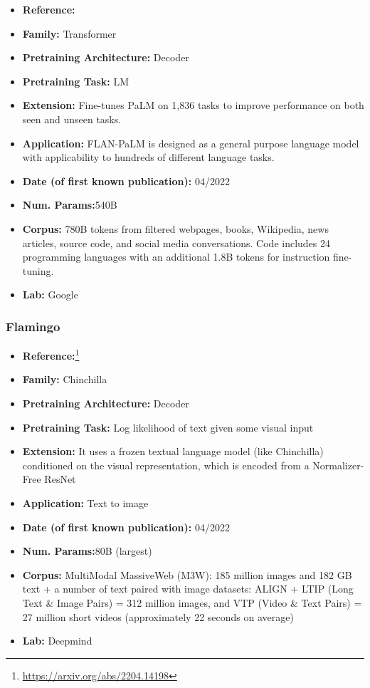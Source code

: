 \documentclass{article}
\begin{document}
            \begin{itemize}
                \item \textbf{Reference:}\cite{chung2022flan}
                \item \textbf{Family:} Transformer 
                \item \textbf{Pretraining Architecture:} Decoder
                \item \textbf{Pretraining Task:} LM
                \item \textbf{Extension:} Fine-tunes PaLM on 1,836 tasks to improve performance on both seen and unseen tasks.
                \item \textbf{Application:} FLAN-PaLM is designed as a general purpose language model with applicability to hundreds of different language tasks.
                \item \textbf{Date (of first known publication):} 04/2022
                \item \textbf{Num. Params:}540B
                \item \textbf{Corpus:} 780B tokens from filtered webpages, books, Wikipedia, news articles, source code, and social media conversations. Code includes 24 programming languages with an additional 1.8B tokens for instruction fine-tuning.
                \item \textbf{Lab:} Google
            \end{itemize}

\subsubsection{Flamingo}

            \begin{itemize}
                \item \textbf{Reference:}\footnote{\url{https://arxiv.org/abs/2204.14198}}\cite{alayrac2022flamingo}
                \item \textbf{Family:} Chinchilla 
                \item \textbf{Pretraining Architecture:} Decoder
                \item \textbf{Pretraining Task:} Log likelihood of text given some visual input
                \item \textbf{Extension:} It uses a frozen textual language model (like Chinchilla) conditioned on the visual representation, which is encoded from a Normalizer-Free ResNet  
                \item \textbf{Application:} Text to image
                \item \textbf{Date (of first known publication):} 04/2022
                \item \textbf{Num. Params:}80B (largest)
                \item \textbf{Corpus:} MultiModal MassiveWeb (M3W): 185 million images and 182 GB text + a number of text paired with image datasets: ALIGN + LTIP (Long Text \& Image Pairs) = 312 million images, and VTP (Video \& Text Pairs) = 27 million short videos (approximately 22 seconds on average)
                \item \textbf{Lab:} Deepmind
            \end{itemize}
            
\end{document}
